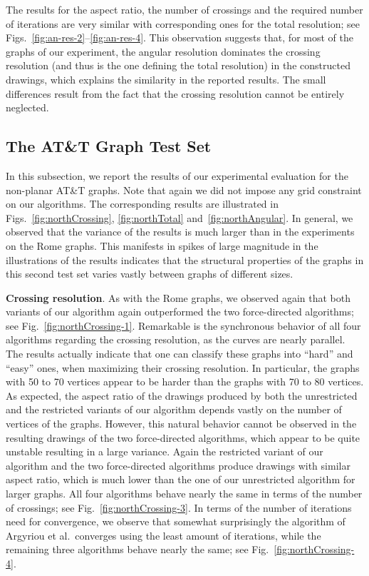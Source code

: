\documentclass{comjnl}
\newcommand{\myparagraph}[1]{\medskip\noindent\textbf{#1}.}
\begin{document}
The results for the aspect ratio, the number of crossings and the required number of iterations are very similar with corresponding ones for the total resolution; see Figs.~\ref{fig:an-res-2}--\ref{fig:an-res-4}. This observation suggests that, for most of the graphs of our experiment, the angular resolution dominates the crossing resolution (and thus is the one defining the total resolution) in the constructed drawings, which explains the similarity in the reported results. The small differences result from the fact that the crossing resolution cannot be entirely neglected.

\subsection{The AT\&T  Graph Test Set}
\label{ssec:north}

In this subsection, we report the results of our experimental evaluation for the non-planar AT\&T graphs. Note that again we did not impose any grid constraint on our algorithms. The corresponding results are illustrated in Figs.~\ref{fig:northCrossing}, \ref{fig:northTotal} and~\ref{fig:northAngular}. In general, we observed that the variance of the results is much larger than in the experiments on the Rome graphs. This manifests in spikes of large magnitude in the illustrations of the results indicates that the structural properties of the graphs in this second test set varies vastly between graphs of different sizes.

\myparagraph{Crossing resolution} As with the Rome graphs, we observed again that both variants of our algorithm again outperformed the two force-directed algorithms; see Fig.~\ref{fig:northCrossing-1}. Remarkable is the synchronous behavior of all four algorithms regarding the crossing resolution, as the curves are nearly parallel. The results actually indicate that one can classify these graphs into ``hard'' and ``easy'' ones, when maximizing their crossing resolution. In particular, the graphs with 50 to 70 vertices appear to be harder than the graphs with 70 to 80 vertices. As expected, the aspect ratio of the drawings produced by both the unrestricted and the restricted variants of our algorithm depends vastly on the number of vertices of the graphs. However, this natural behavior cannot be observed in the resulting drawings of the two force-directed algorithms, which appear to be quite unstable resulting in a large variance. Again the restricted variant of our algorithm and the two force-directed algorithms produce drawings with similar aspect ratio, which is much lower than the one of our unrestricted algorithm for larger graphs. All four algorithms behave nearly the same in terms of the number of crossings; see Fig.~\ref{fig:northCrossing-3}. In terms of the number of iterations need for convergence, we observe that somewhat surprisingly the algorithm of Argyriou et al.\ converges using the least amount of iterations, while the remaining three algorithms behave nearly the same; see Fig.~\ref{fig:northCrossing-4}.
\end{document}
